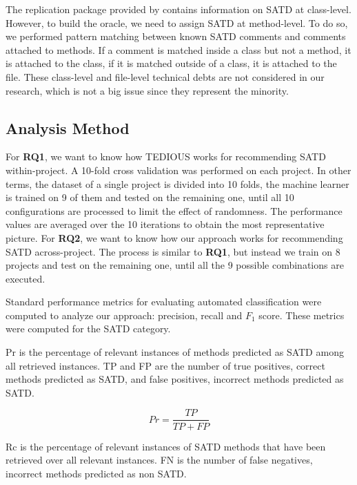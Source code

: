 The replication package provided by \citet{maldonado17} contains information on \ac{SATD} at class-level. However, to build the oracle, we need to assign \ac{SATD} at method-level. To do so, we performed pattern matching between known \ac{SATD} comments and comments attached to methods. If a comment is matched inside a class but not a method, it is attached to the class, if it is matched outside of a class, it is attached to the file. These class-level and file-level technical debts are not considered in our research, which is not a big issue since they represent the minority.

\subsection{Analysis Method}


For \textbf{RQ1}, we want to know how \ac{TEDIOUS} works for recommending \ac{SATD} within-project. A 10-fold cross validation was performed on each project. In other terms, the dataset of a single project is divided into 10 folds, the machine learner is trained on 9 of them and tested on the remaining one, until all 10 configurations are processed to limit the effect of randomness. The performance values are averaged over the 10 iterations to obtain the most representative picture. For \textbf{RQ2}, we want to know how our approach works for recommending \ac{SATD} across-project. The process is similar to \textbf{RQ1}, but instead we train on 8 projects and test on the remaining one, until all the 9 possible combinations are executed. \par 

Standard performance metrics for evaluating automated classification were computed to analyze our approach: precision, recall and $F_{1}$ score. These metrics were computed for the \ac{SATD} category. \par 

\ac{Pr} is the percentage of relevant instances of methods predicted as \ac{SATD} among all retrieved instances. \ac{TP} and \ac{FP} are the number of true positives, correct methods predicted as \ac{SATD}, and false positives, incorrect methods predicted as \ac{SATD}.

\[
Pr=\frac{TP}{TP+FP}
\]

\ac{Rc} is the percentage of relevant instances of \ac{SATD} methods that have been retrieved over all relevant instances. \ac{FN} is the number of false negatives, incorrect methods predicted as non \ac{SATD}.

